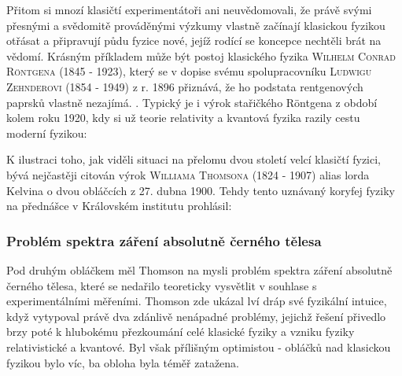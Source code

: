       Přitom si mnozí klasičtí experimentátoři ani neuvědomovali, že právě svými přesnými a
      svědomitě prováděnými výzkumy vlastně začínají klasickou fyzikou otřásat a připravují půdu
      fyzice nové, jejíž rodící se koncepce nechtěli brát na vědomí. Krásným příkladem může být
      postoj klasického fyzika \textsc{Wilhelm Conrad Röntgena} (1845 - 1923), který se v dopise
      svému spolupracovníku \textsc{Ludwigu Zehnderovi} (1854 - 1949) z r. 1896 přiznává, že ho
      podstata rentgenových paprsků vlastně nezajímá. \emph{}. Typický je i výrok stařičkého Röntgena
      z období kolem roku 1920, kdy si už teorie relativity a kvantová fyzika razily cestu moderní
      fyzikou: \emph{}
      
      K ilustraci toho, jak viděli situaci na přelomu dvou století velcí klasičtí fyzici, bývá
      nejčastěji citován výrok \textsc{Williama Thomsona} (1824 - 1907) alias lorda Kelvina o dvou
      obláčcích z 27. dubna 1900. Tehdy tento uznávaný koryfej fyziky na přednášce v Královském
      institutu prohlásil:
      
      
      \emph{}

      \subsubsection{Problém spektra záření absolutně černého tělesa}\label{fyz:IchapIIsecIVssecIsssecI}

        Pod druhým obláčkem měl Thomson na mysli problém spektra záření absolutně černého tělesa,
        které se nedařilo teoreticky vysvětlit v souhlase s experimentálními měřeními. Thomson zde
        ukázal lví dráp své fyzikální intuice, když vytypoval právě dva zdánlivě nenápadné problémy,
        jejichž řešení přivedlo brzy poté k hlubokému přezkoumání celé klasické fyziky a vzniku
        fyziky relativistické a kvantové. Byl však přílišným optimistou - obláčků nad klasickou
        fyzikou bylo víc, ba obloha byla téměř zatažena.
    
